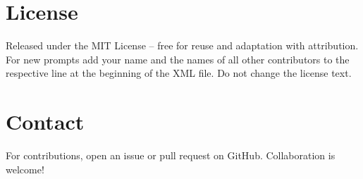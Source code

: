\documentclass[a4paper,11pt]{refart}
\begin{document}
\section{License}
Released under the MIT License -- free for reuse and adaptation with attribution. For new prompts add your name and the names of all other contributors to the respective line at the beginning of the XML file. Do not change the license text.

\section{Contact}
For contributions, open an issue or pull request on GitHub. Collaboration is welcome!


% 
% 
\end{document}
